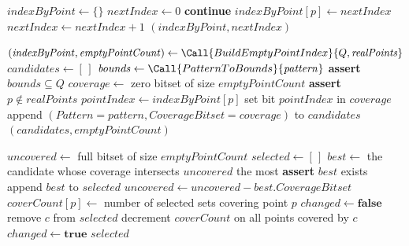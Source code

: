 \begin{algorithm}[t]
\caption{Approximate minimum key cover}
\begin{algorithmic}[1]
    \State $\mathit{indexByPoint} \gets \{\}$
    \State $\mathit{nextIndex} \gets 0$
            \State \textbf{continue}
        \EndIf
        \State $\mathit{indexByPoint}[p] \gets \mathit{nextIndex}$
        \State $\mathit{nextIndex} \gets \mathit{nextIndex} + 1$
    \EndFor
    \State \Return $(\mathit{indexByPoint}, \mathit{nextIndex})$
\EndProcedure

    \State $(\mathit{indexByPoint}, \mathit{emptyPointCount}) \gets \Call{BuildEmptyPointIndex}{Q, \mathit{realPoints}}$
    \State $\mathit{candidates} \gets [\,]$
        \State $\mathit{bounds} \gets \Call{PatternToBounds}{\mathit{pattern}}$
        \State \textbf{assert} $\mathit{bounds} \subseteq Q$
        \State $\mathit{coverage} \gets$ zero bitset of size $\mathit{emptyPointCount}$
            \State \textbf{assert} $p \notin \mathit{realPoints}$
            \State $\mathit{pointIndex} \gets \mathit{indexByPoint}[p]$
            \State set bit $\mathit{pointIndex}$ in $\mathit{coverage}$
        \EndFor
            \State append $(\mathit{Pattern}=\mathit{pattern}, \mathit{CoverageBitset}=\mathit{coverage})$ to $\mathit{candidates}$
        \EndIf
    \EndFor
    \State \Return $(\mathit{candidates}, \mathit{emptyPointCount})$
\EndProcedure

    \State $\mathit{uncovered} \gets$ full bitset of size $\mathit{emptyPointCount}$
    \State $\mathit{selected} \gets [\,]$
        \State $\mathit{best} \gets$ the candidate whose coverage intersects $\mathit{uncovered}$ the most
        \State \textbf{assert} $\mathit{best}$ exists
        \State append $\mathit{best}$ to $\mathit{selected}$
        \State $\mathit{uncovered} \gets \mathit{uncovered} - \mathit{best}.\mathit{CoverageBitset}$
    \EndWhile
    \State $\mathit{coverCount}[p] \gets$ number of selected sets covering point $p$
    \Repeat
        \State $\mathit{changed} \gets \textbf{false}$
                \State remove $c$ from $\mathit{selected}$
                \State decrement $\mathit{coverCount}$ on all points covered by $c$
                \State $\mathit{changed} \gets \textbf{true}$
            \EndIf
        \EndFor
    \State \Return $\mathit{selected}$ 
\EndProcedure
\end{algorithmic}
\end{algorithm}

